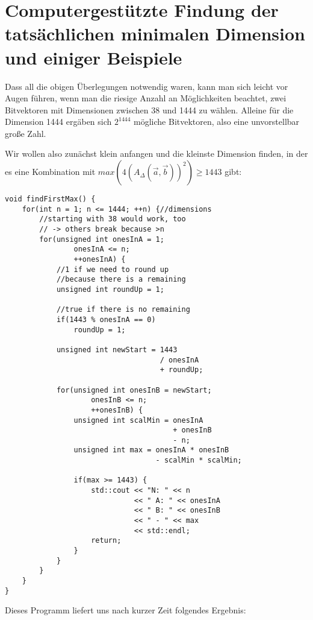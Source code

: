 \documentclass{article}
\begin{document}
\section{Computergestützte Findung der tatsächlichen minimalen Dimension und einiger Beispiele}

Dass all die obigen Überlegungen notwendig waren, kann man sich leicht vor Augen führen, wenn man die riesige Anzahl an Möglichkeiten beachtet, zwei Bitvektoren mit Dimensionen zwischen 38 und 1444 zu wählen. Alleine für die Dimension 1444 ergäben sich $2^{1444}$ mögliche Bitvektoren, also eine unvorstellbar große Zahl. 

Wir wollen also zunächst klein anfangen und die kleinste Dimension finden, in der es eine Kombination mit $max(4(A_\Delta(\vec a,\vec b))^2) \geq 1443$ gibt:

\lstset{language=C++}

\begin{lstlisting}[frame=single]
void findFirstMax() {
    for(int n = 1; n <= 1444; ++n) {//dimensions
        //starting with 38 would work, too
        // -> others break because >n
        for(unsigned int onesInA = 1;
                onesInA <= n;
                ++onesInA) {
            //1 if we need to round up
            //because there is a remaining
            unsigned int roundUp = 1;

            //true if there is no remaining
            if(1443 % onesInA == 0)
                roundUp = 1;

            unsigned int newStart = 1443
                                    / onesInA
                                    + roundUp;

            for(unsigned int onesInB = newStart;
                    onesInB <= n;
                    ++onesInB) {
                unsigned int scalMin = onesInA
                                       + onesInB
                                       - n;
                unsigned int max = onesInA * onesInB
                                   - scalMin * scalMin;

                if(max >= 1443) {
                    std::cout << "N: " << n
                              << " A: " << onesInA
                              << " B: " << onesInB
                              << " - " << max
                              << std::endl;
                    return;
                }
            }
        }
    }
}
\end{lstlisting}

Dieses Programm liefert uns nach kurzer Zeit folgendes Ergebnis:
\end{document}
